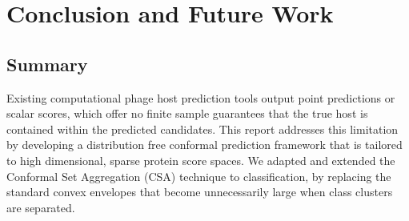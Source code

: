 \chapter{Conclusion and Future Work}
\label{sec6: conclusion}

\section{Summary}
\label{sec6.1: summary}

Existing computational phage host prediction tools output point predictions or scalar scores, which offer no finite 
sample guarantees that the true host is contained within the predicted candidates. This report addresses this limitation by 
developing a distribution free conformal prediction framework that is tailored to high dimensional, sparse protein score 
spaces. We adapted and extended the Conformal Set Aggregation (CSA) technique to classification, by replacing the 
standard convex envelopes that become unnecessarily large when class clusters are separated.

